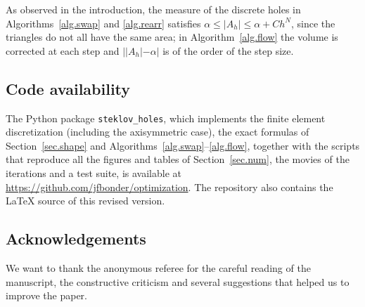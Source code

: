\documentclass[11pt]{amsart}
\theoremstyle{remark}
\numberwithin{equation}{section}
\begin{document}
As observed in the introduction, the measure of the discrete holes in Algorithms~\ref{alg.swap} and \ref{alg.rearr} satisfies $\alpha\le|A_h|\le\alpha+Ch^N$, since the triangles do not all have the same area; in Algorithm~\ref{alg.flow} the volume is corrected at each step and $||A_h|-\alpha|$ is of the order of the step size.

\subsection*{Code availability}
The Python package \texttt{steklov\_holes}, which implements the finite element discretization (including the axisymmetric case), the exact formulas of Section~\ref{sec.shape} and Algorithms~\ref{alg.swap}--\ref{alg.flow}, together with the scripts that reproduce all the figures and tables of Section~\ref{sec.num}, the movies of the iterations and a test suite, is available at \url{https://github.com/jfbonder/optimization}. The repository also contains the \LaTeX{} source of this revised version.

\subsection*{Acknowledgements}
We want to thank the anonymous referee for the careful reading of the manuscript, the constructive criticism and several suggestions that helped us to improve the paper.
\end{document}
